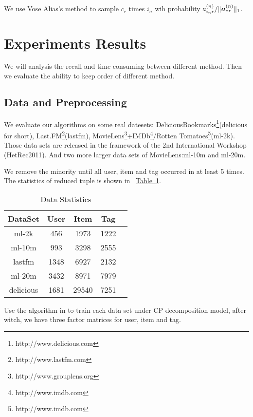 \documentclass[letterpaper]{article}
\newcommand{\Sca}[3]{{#1}^{(#2)}_{i_#2#3}}%
\newcommand{\V}[1]{{\bm{{\MakeLowercase{#1}}}}}
\newcommand{\VnC}[3]{\V{#1}^{(#2)}_{#3}}
\newcommand{\Nrocl}[2]{\norm{\VnC{a}{#1}{*#2}}{1}}
\newcommand{\norm}[2]{\|#1\|_{#2}}
\newcommand{\Table}[1] {\hyperref[table:#1] {Table~\ref*{table:#1}}} %
\begin{document}
We use Vose Alias's method to sample $c_r$ times $i_n$ wih probability ${\Sca{a}{n}{r}}/\Nrocl{n}{r}$.

\section{Experiments Results}
We will analysis the recall and time consuming  between different method. Then we evaluate the ability to keep order of different method.

\subsection{Data and Preprocessing}
We evaluate our algorithms on some real datesets:
DeliciousBookmarks\footnote{http://www.delicious.com
}(delicious for short),
Last.FM\footnote{http://www.lastfm.com}(lastfm),
MovieLens\footnote{http://www.grouplens.org}+IMDb\footnote{http://www.imdb.com }/Rotten Tomatoes\footnote{http://www.imdb.com}(ml-2k).
Those data sets are released in the framework of the 2nd International Workshop (HetRec2011)\cite{Cantador:RecSys2011}.
And two more larger data sets of MovieLens\cite{Harper2015}:ml-10m and ml-20m.

We remove the minority until all user, item and tag occurred in at least 5 times. The statistics of reduced tuple is shown in ~\Table{Data}.

\begin{table}[ht]
  \label{table:Data}
  \centering
  \begin{tabular}{|c|c|c|c|c|}
    \hline
    DataSet & User & Item & Tag \\
    \hline
    ml-2k       & 456  &  1973   &  1222  \\
    ml-10m      & 993  &  3298   &  2555  \\
    lastfm      & 1348 &  6927   &  2132  \\
    ml-20m      & 3432 &  8971   &  7979  \\
    delicious   & 1681 &  29540  &  7251  \\
    \hline
  \end{tabular}
  \caption{Data Statistics}
\end{table}
Use the algorithm in \cite{Rendle_RTF} to train each data set under CP decomposition model,
after witch, we have three factor matrices for user, item and tag.
\end{document}
